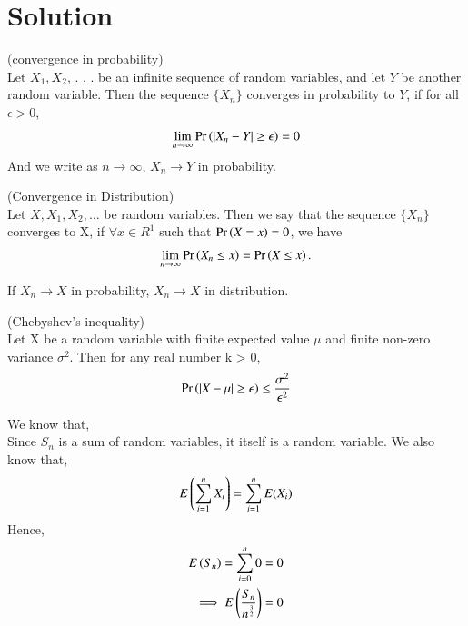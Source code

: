 \documentclass[journal,12pt,twocolumn]{IEEEtran}
\begin{document}
\section{Solution} 
\begin{definition}
    (convergence in probability)\\
    Let $X_1, X_2$, . . . be an infinite sequence of random variables, and let $Y$ be another random variable. Then the sequence $\{X_{n}\}$ converges in probability to $Y$, if for all $\epsilon >0$, 
    \begin{align}
        \lim_{n \to \infty}\Pr\left(|X_n-Y|\geq \epsilon\right)=0
    \end{align}
And we write as $n \to \infty$, $X_n \to Y$ in probability.
\end{definition}
\begin{definition}
        (Convergence in Distribution)\\
        Let $X, X_{1}, X_{2},\dots $ be random variables. Then we say that the sequence $\{X_n\}$ converges to X, if $\forall x \in R^1$ such that $\Pr\left(X=x\right)=0$, we have
        \begin{align}
            \lim_{n \to \infty}\Pr\left(X_n \leq x\right)=\Pr\left(X \leq x\right).
        \end{align}
        \end{definition}
\begin{theorem} \label{1}
        If $X_n \to X$ in probability, $X_n \to X$ in distribution.
        \end{theorem}
\begin{theorem} \label{2}
(Chebyshev's inequality)\\
        Let X be a random variable with finite expected value $\mu$ and finite non-zero variance $\sigma^2$. Then for any real number k > 0,
        \begin{align}
            \Pr\left(\left\vert X-\mu\right\vert\geq \epsilon\right) \leq \frac{\sigma^{2}}{\epsilon^{2}}
        \end{align}
\end{theorem}
We know that,\\Since $S_{n}$ is a sum of random variables, it itself is a random variable.
We also know that, 
\begin{align} 
E\left(\sum_{i=1}^{n}X_{i}\right)=\sum_{i=1}^{n}E(X_{i}) 
\end{align} 
Hence, 
\begin{align} 
E\left(S_{n}\right)=\sum_{i=0}^{n}0=0 \\
\implies E\left(\frac{S_{n}}{n^{\frac{3}{2}}}\right)=0
\end{align} 
\end{document}
